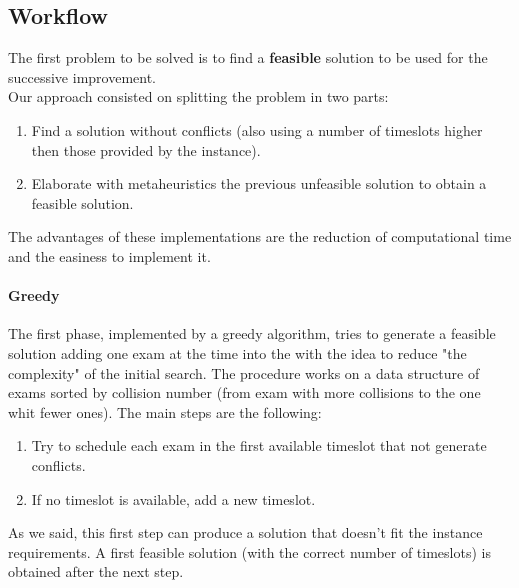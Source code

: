 \documentclass[12pt]{article}
\begin{document}
\subsection{Workflow}
The first problem to be solved is to find a \textbf{feasible} solution to be used for the successive improvement.\\
Our approach consisted on splitting the problem in two parts:
\begin{enumerate}
  \item Find a solution without conflicts (also using a number of timeslots higher then those provided by  the instance).
  \item Elaborate with metaheuristics the previous unfeasible solution to obtain a feasible solution.
\end{enumerate}
The advantages of these implementations are the reduction of computational time and the easiness to implement it.

\paragraph{Greedy} The first phase, implemented by a greedy algorithm, tries to generate a feasible solution adding one exam at the time into the with the idea to reduce "the complexity" of the initial search.
The procedure works on a data structure of exams sorted by collision number (from exam with more collisions to the one whit fewer ones). The main steps are the following:
\begin{enumerate}
  \item Try to schedule each exam in the first available timeslot that not generate conflicts.
  \item If no timeslot is available, add a new timeslot.
\end{enumerate}
As we said, this first step can produce a solution that doesn't fit the instance requirements.
A first feasible solution (with the correct number of timeslots) is obtained after the next step.
\end{document}

